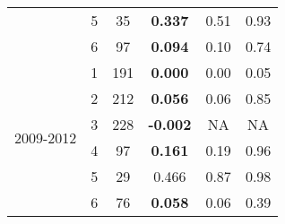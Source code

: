 \begin{table}[htbp]
\begin{tabular}{rrrrrr}
    \multicolumn{1}{c}{} & \multicolumn{1}{c}{5} & \multicolumn{1}{c}{35} & \multicolumn{1}{c}{\textbf{0.337 }} & \multicolumn{1}{c}{0.51 } & \multicolumn{1}{c}{0.93 } \\
    \multicolumn{1}{c}{} & \multicolumn{1}{c}{6} & \multicolumn{1}{c}{97} & \multicolumn{1}{c}{\textbf{0.094 }} & \multicolumn{1}{c}{0.10 } & \multicolumn{1}{c}{0.74 } \\\midrule
    \multicolumn{1}{c}{\multirow{6}[2]{*}{\begin{sideways}2009-2012\end{sideways}}} & \multicolumn{1}{c}{1} & \multicolumn{1}{c}{191} & \multicolumn{1}{c}{\textbf{0.000 }} & \multicolumn{1}{c}{0.00 } & \multicolumn{1}{c}{0.05 } \\
    \multicolumn{1}{c}{} & \multicolumn{1}{c}{2} & \multicolumn{1}{c}{212} & \multicolumn{1}{c}{\textbf{0.056 }} & \multicolumn{1}{c}{0.06 } & \multicolumn{1}{c}{0.85 } \\
    \multicolumn{1}{c}{} & \multicolumn{1}{c}{3} & \multicolumn{1}{c}{228} & \multicolumn{1}{c}{\textbf{-0.002 }} & \multicolumn{1}{c}{NA} & \multicolumn{1}{c}{NA} \\
    \multicolumn{1}{c}{} & \multicolumn{1}{c}{4} & \multicolumn{1}{c}{97} & \multicolumn{1}{c}{\textbf{0.161 }} & \multicolumn{1}{c}{0.19 } & \multicolumn{1}{c}{0.96 } \\
    \multicolumn{1}{c}{} & \multicolumn{1}{c}{5} & \multicolumn{1}{c}{29} & \multicolumn{1}{c}{0.466 } & \multicolumn{1}{c}{0.87 } & \multicolumn{1}{c}{0.98 } \\
    \multicolumn{1}{c}{} & \multicolumn{1}{c}{6} & \multicolumn{1}{c}{76} & \multicolumn{1}{c}{\textbf{0.058 }} & \multicolumn{1}{c}{0.06 } & \multicolumn{1}{c}{0.39 } \\
    \bottomrule
    \end{tabular}%
  \label{tab:ANCTVPHPA}%
\end{table}%
